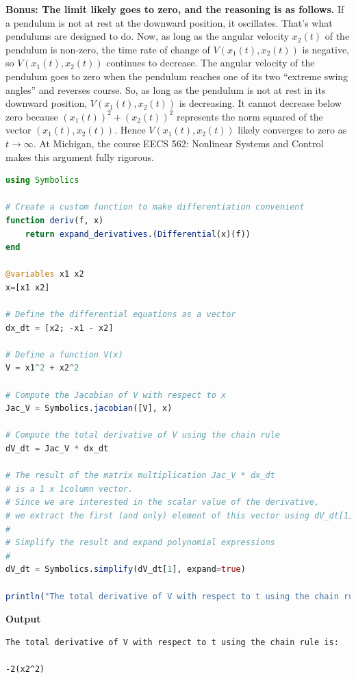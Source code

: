\textbf{Bonus: The limit likely goes to zero, and the reasoning is as follows.} If a pendulum is not at rest at the downward position, it oscillates. That's what pendulums are designed to do. Now, as long as the angular velocity $x_2(t)$ of the pendulum is non-zero, the time rate of change of $V(x_1(t), x_2(t))$ is negative, so $V(x_1(t), x_2(t))$ continues to decrease. The angular velocity of the pendulum goes to zero when the pendulum reaches one of its two ``extreme swing angles'' and reverses course. So, as long as the pendulum is not at rest in its downward position, $V(x_1(t), x_2(t))$ is decreasing. It cannot decrease below zero because $(x_1(t))^2 + (x_2(t))^2$ represents the norm squared of the vector $(x_1(t), x_2(t))$. Hence $V(x_1(t), x_2(t))$ likely converges to zero as $t \to \infty$. At Michigan, the course EECS 562: Nonlinear Systems and Control makes this argument fully rigorous. 

\begin{lstlisting}[language=Julia,style=mystyle]
using Symbolics

# Create a custom function to make differentiation convenient
function deriv(f, x)
    return expand_derivatives.(Differential(x)(f))
end

@variables x1 x2
x=[x1 x2]

# Define the differential equations as a vector
dx_dt = [x2; -x1 - x2]

# Define a function V(x)
V = x1^2 + x2^2 

# Compute the Jacobian of V with respect to x
Jac_V = Symbolics.jacobian([V], x)

# Compute the total derivative of V using the chain rule 
dV_dt = Jac_V * dx_dt

# The result of the matrix multiplication Jac_V * dx_dt 
# is a 1 x 1column vector. 
# Since we are interested in the scalar value of the derivative, 
# we extract the first (and only) element of this vector using dV_dt[1].
#
# Simplify the result and expand polynomial expressions
#
dV_dt = Symbolics.simplify(dV_dt[1], expand=true)

println("The total derivative of V with respect to t using the chain rule is:\n \n", dV_dt)

\end{lstlisting}
\textbf{Output} 
\begin{verbatim}
The total derivative of V with respect to t using the chain rule is:
 
-2(x2^2)
\end{verbatim}
\Qed







